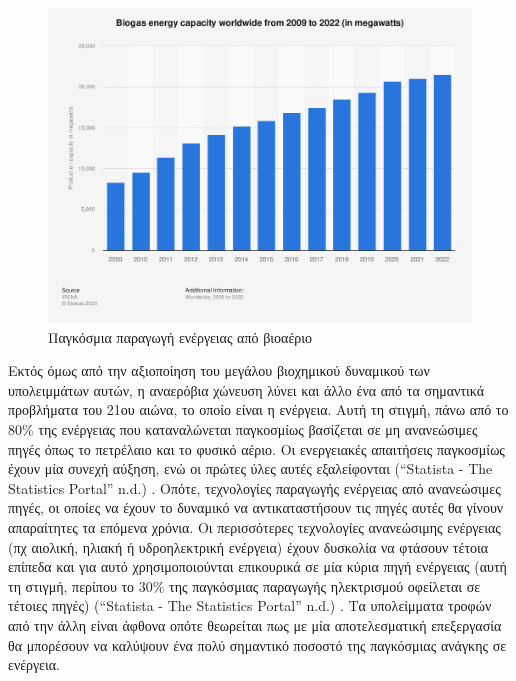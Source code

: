 \documentclass[11pt]{article}
\begin{document}
\begin{figure}[htbp]
\centering
\includegraphics[width=.9\linewidth]{../plots/statistics/statistic_id1032922_global-biogas-energy-capacity-2009-2022.png}
\caption{\label{fig:org6740cd1}Παγκόσμια παραγωγή ενέργειας από βιοαέριο}
\end{figure}

Εκτός όμως από την αξιοποίηση του μεγάλου βιοχημικού δυναμικού των υπολειμμάτων αυτών, η αναερόβια χώνευση λύνει και άλλο ένα από τα σημαντικά προβλήματα του 21ου αιώνα, το οποίο είναι η ενέργεια. Αυτή τη στιγμή, πάνω από το \(80 \%\) της ενέργειας που καταναλώνεται παγκοσμίως βασίζεται σε μη ανανεώσιμες πηγές όπως το πετρέλαιο και το φυσικό αέριο. Οι ενεργειακές απαιτήσεις παγκοσμίως έχουν μία συνεχή αύξηση, ενώ οι πρώτες ύλες αυτές εξαλείφονται (“Statista - The Statistics Portal” n.d.) . Οπότε, τεχνολογίες παραγωγής ενέργειας από ανανεώσιμες πηγές, οι οποίες να έχουν το δυναμικό να αντικαταστήσουν τις πηγές αυτές θα γίνουν απαραίτητες τα επόμενα χρόνια. Οι περισσότερες τεχνολογίες ανανεώσιμης ενέργειας (πχ αιολική, ηλιακή ή υδροηλεκτρική ενέργεια) έχουν δυσκολία να φτάσουν τέτοια επίπεδα και για αυτό χρησιμοποιούνται επικουρικά σε μία κύρια πηγή ενέργειας (αυτή τη στιγμή, περίπου το \(30 \%\) της παγκόσμιας παραγωγής ηλεκτρισμού οφείλεται σε τέτοιες πηγές) (“Statista - The Statistics Portal” n.d.) . Τα υπολείμματα τροφών από την άλλη είναι άφθονα οπότε θεωρείται πως με μία αποτελεσματική επεξεργασία θα μπορέσουν να καλύψουν ένα πολύ σημαντικό ποσοστό της παγκόσμιας ανάγκης σε ενέργεια.
\end{document}
